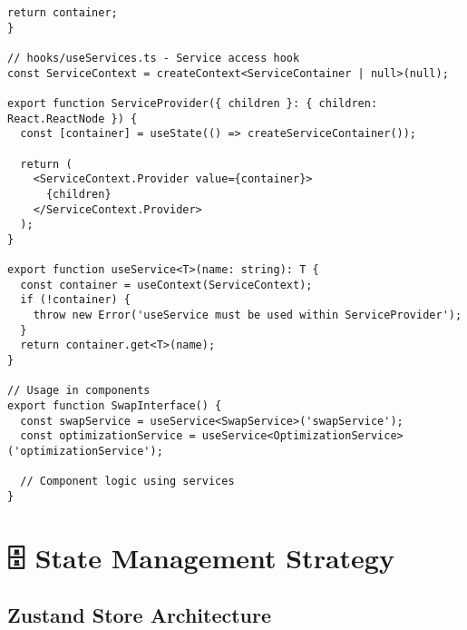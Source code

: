 \documentclass[11pt,a4paper]{article}
\begin{document}
\begin{lstlisting}[style=typescript, caption=Service Container and Dependency Injection]
  return container;
}

// hooks/useServices.ts - Service access hook
const ServiceContext = createContext<ServiceContainer | null>(null);

export function ServiceProvider({ children }: { children: React.ReactNode }) {
  const [container] = useState(() => createServiceContainer());
  
  return (
    <ServiceContext.Provider value={container}>
      {children}
    </ServiceContext.Provider>
  );
}

export function useService<T>(name: string): T {
  const container = useContext(ServiceContext);
  if (!container) {
    throw new Error('useService must be used within ServiceProvider');
  }
  return container.get<T>(name);
}

// Usage in components
export function SwapInterface() {
  const swapService = useService<SwapService>('swapService');
  const optimizationService = useService<OptimizationService>('optimizationService');
  
  // Component logic using services
}
\end{lstlisting}

\section{🗄️ State Management Strategy}

\subsection{Zustand Store Architecture}
\end{document}
